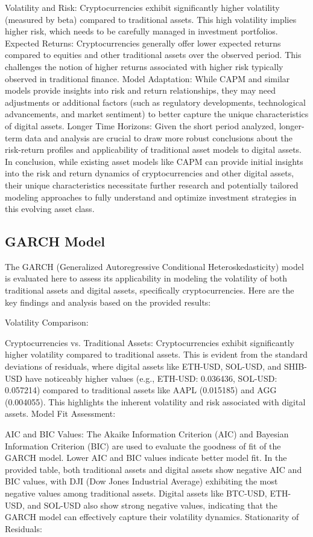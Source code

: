 Volatility and Risk: Cryptocurrencies exhibit significantly higher volatility (measured by beta) compared to traditional assets. This high volatility implies higher risk, which needs to be carefully managed in investment portfolios.
Expected Returns: Cryptocurrencies generally offer lower expected returns compared to equities and other traditional assets over the observed period. This challenges the notion of higher returns associated with higher risk typically observed in traditional finance.
Model Adaptation: While CAPM and similar models provide insights into risk and return relationships, they may need adjustments or additional factors (such as regulatory developments, technological advancements, and market sentiment) to better capture the unique characteristics of digital assets.
Longer Time Horizons: Given the short period analyzed, longer-term data and analysis are crucial to draw more robust conclusions about the risk-return profiles and applicability of traditional asset models to digital assets.
In conclusion, while existing asset models like CAPM can provide initial insights into the risk and return dynamics of cryptocurrencies and other digital assets, their unique characteristics necessitate further research and potentially tailored modeling approaches to fully understand and optimize investment strategies in this evolving asset class.

\subsection{GARCH Model}

The GARCH (Generalized Autoregressive Conditional Heteroskedasticity) model is evaluated here to assess its applicability in modeling the volatility of both traditional assets and digital assets, specifically cryptocurrencies. Here are the key findings and analysis based on the provided results:

Volatility Comparison:

Cryptocurrencies vs. Traditional Assets: Cryptocurrencies exhibit significantly higher volatility compared to traditional assets. This is evident from the standard deviations of residuals, where digital assets like ETH-USD, SOL-USD, and SHIB-USD have noticeably higher values (e.g., ETH-USD: 0.036436, SOL-USD: 0.057214) compared to traditional assets like AAPL (0.015185) and AGG (0.004055). This highlights the inherent volatility and risk associated with digital assets.
Model Fit Assessment:

AIC and BIC Values: The Akaike Information Criterion (AIC) and Bayesian Information Criterion (BIC) are used to evaluate the goodness of fit of the GARCH model. Lower AIC and BIC values indicate better model fit. In the provided table, both traditional assets and digital assets show negative AIC and BIC values, with DJI (Dow Jones Industrial Average) exhibiting the most negative values among traditional assets. Digital assets like BTC-USD, ETH-USD, and SOL-USD also show strong negative values, indicating that the GARCH model can effectively capture their volatility dynamics.
Stationarity of Residuals:

